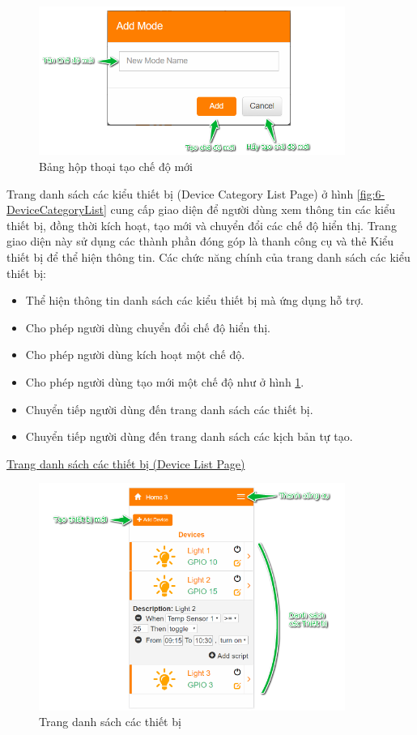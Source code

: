 \documentclass[12pt,a4paper,oneside]{extbook}
\begin{document}
\begin{figure}[h]
  \centering
     \includegraphics[width=10cm]{6-AddMode}
  \caption{Bảng hộp thoại tạo chế độ mới}\label{fig:6-AddMode}
\end{figure}

\noindent
Trang danh sách các kiểu thiết bị (Device Category List Page) ở hình \ref{fig:6-DeviceCategoryList} cung cấp giao diện để người dùng xem thông tin các kiểu thiết bị, đồng thời kích hoạt, tạo mới và chuyển đổi các chế độ hiển thị. Trang giao diện này sử dụng các thành phần đóng góp là thanh công cụ và thẻ Kiểu thiết bị để thể hiện thông tin. Các chức năng chính của trang danh sách các kiểu thiết bị:

\begin{itemize}[topsep=1mm,itemsep=-0.5mm]
\item Thể hiện thông tin danh sách các kiểu thiết bị mà ứng dụng hỗ trợ.
\item Cho phép người dùng chuyển đổi chế độ hiển thị.
\item Cho phép người dùng kích hoạt một chế độ.

\item Cho phép người dùng tạo mới một chế độ như ở hình \ref{fig:6-AddMode}.
\item Chuyển tiếp người dùng đến trang danh sách các thiết bị.
\item Chuyển tiếp người dùng đến trang danh sách các kịch bản tự tạo.
\vspace{1mm}
\end{itemize}

\noindent
\underline{Trang danh sách các thiết bị (Device List Page)}

\begin{figure}[h]
  \centering
     \includegraphics[width=10cm]{6-DeviceListPage}
  \caption{Trang danh sách các thiết bị}\label{fig:6-DeviceListPage}
\end{figure}
\end{document}
